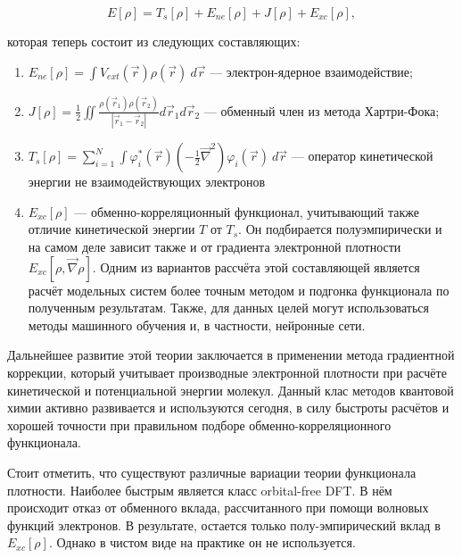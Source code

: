 \documentclass[a4paper,12pt]{article}
\begin{document}
\begin{onehalfspace}
	\begin{equation}
		E[\rho] = T_s[\rho] + E_{ne}[\rho] + J[\rho] + E_{xc}[\rho],
	\end{equation}
	
	которая теперь состоит из следующих составляющих:
	
	\begin{enumerate}
		\item[—] $E_{ne}[\rho] = \int V_{ext}(\vec r) \rho(\vec r)\ d\vec r$ — электрон-ядерное взаимодействие;
		\item[—] $J[\rho] = \frac12 \iint \frac{\rho(\vec r_1)\rho(\vec r_2)}{|\vec r_1 - \vec r_2|} d\vec r_1 d\vec r_2$ — обменный член из метода Хартри-Фока;
		\item[—] $T_s[\rho] = \sum_{i=1}^N \int \varphi_i^* (\vec r) (-\frac12\vec \nabla^2)\varphi_i(\vec r)\ d\vec r$ — оператор кинетической энергии не взаимодействующих электронов
		\item[—] $E_{xc}[\rho]$ — обменно-корреляционный функционал, учитывающий также отличие кинетической энергии $T$ от $T_s$. Он подбирается полуэмпирически и на самом деле зависит также и от градиента электронной плотности $E_{xc}[\rho,\vec \nabla \rho]$. Одним из вариантов рассчёта этой составляющей является расчёт модельных систем более точным методом и подгонка функционала по полученным результатам. Также, для данных целей могут использоваться методы машинного обучения и, в частности, нейронные сети.
	\end{enumerate}
	
	Дальнейшее развитие этой теории заключается в применении метода градиентной коррекции, который учитывает производные электронной плотности при расчёте кинетической и потенциальной энергии молекул. Данный клас методов квантовой химии активно развивается и используются сегодня, в силу быстроты расчётов и хорошей точности при правильном подборе обменно-корреляционного функционала.
	
	Стоит отметить, что существуют различные вариации теории функционала плотности. Наиболее быстрым является класс orbital-free DFT. В нём происходит отказ от обменного вклада, рассчитанного при помощи волновых функций электронов. В результате, остается только полу-эмпирический вклад в $E_{xc}[\rho]$. Однако в чистом виде на практике он не используется.
	

\end{onehalfspace}
\end{document}
